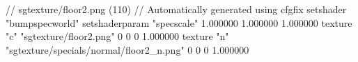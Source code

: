 // sgtexture/floor2.png (110)
// Automatically generated using cfgfix
setshader "bumpspecworld"
setshaderparam "specscale" 1.000000 1.000000 1.000000
texture "c" "sgtexture/floor2.png" 0 0 0 1.000000
texture "n" "sgtexture/specials/normal/floor2_n.png" 0 0 0 1.000000
